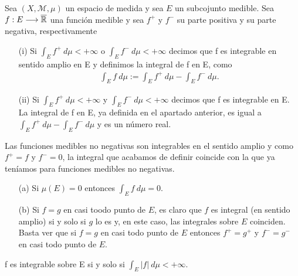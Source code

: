 \begin{defi}
Sea $(X, \mathcal{M}, \mu)$ un espacio de medida y sea $E$ un subcojunto medible. Sea $f: E \longrightarrow \overline{\mathbb{R}}$ una función medible y sea $f^+$ y $f^-$ su parte positiva y su parte negativa, respectivamente
\begin{enumerate}
    \item[(i)] Si $\int_{E}{f^+ \ d\mu} < +\infty$ o $\int_{E}{f^- \ d\mu} < +\infty$ decimos que f es integrable en sentido amplio en E y definimos la integral de f en E, como
    \begin{align*}
        \int_{E}{f \ d\mu} := \int_{E}{f^+ \ d\mu} - \int_{E}{f^- \ d\mu}.
    \end{align*}
    \item[(ii)] Si $\int_{E}{f^+ \ d\mu} < +\infty$ y $\int_{E}{f^- \ d\mu} < +\infty$ decimos que f es integrable en E. La integral de f en E, ya definida en el apartado anterior, es igual a $\int_{E}{f^+ \ d\mu} - \int_{E}{f^- \ d\mu}$ y es un número real.
\end{enumerate}
\end{defi}

\begin{obs}
Las funciones medibles no negativas son integrables en el sentido amplio y como $f^+ = f$ y $f^- = 0$, la integral que acabamos de definir coincide con la que ya teníamos para funciones medibles no negativas.
\end{obs}

\begin{obs}
\begin{enumerate}
    \item[(a)] Si $\mu(E) = 0$ entonces $\int_{E}{f \ d\mu} = 0$.
    \item[(b)] Si $f = g$ en casi toodo punto de $E$, es claro que $f$ es integral (en sentido amplio) si y solo si $g$ lo es y, en este caso, las integrales sobre $E$ coinciden. Basta ver que si $f = g$ en casi todo punto de $E$ entonces $f^+ = g^+$ y $f^- = g^-$ en casi todo punto de $E$.
\end{enumerate}
\end{obs}

\begin{prop}
f es integrable sobre E si y solo si $\int_{E}{|f| \ d\mu} < +\infty$.
\end{prop}

